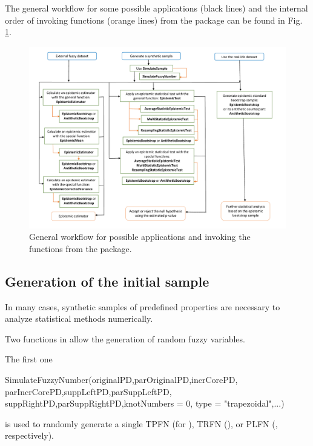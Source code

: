 The general workflow for some possible applications (black lines) and the internal order of invoking functions (orange lines) from the  package can be found in Fig. \ref{figflowchart1}.

\begin{figure}[htb]
  \centering
	\includegraphics[scale=0.5]{flowchart3.pdf}
	\caption{General workflow for possible applications and invoking the functions from the  package.}
	\label{figflowchart1}
\end{figure}


\subsection{Generation of the initial sample}

\label{genofinsa}

In many cases, synthetic samples of predefined properties are necessary to analyze statistical methods numerically.

Two functions in  allow the generation of random fuzzy variables.

The first one

\begin{example}
SimulateFuzzyNumber(originalPD,parOriginalPD,incrCorePD,
  parIncrCorePD,suppLeftPD,parSuppLeftPD,
  suppRightPD,parSuppRightPD,knotNumbers = 0,
  type = "trapezoidal",...)
\end{example}

is used to randomly generate a single TPFN (for ), TRFN (), or PLFN (, respectively).

